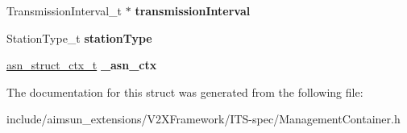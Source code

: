 \begin{DoxyCompactItemize}
\item 
Transmission\+Interval\+\_\+t $\ast$ {\bfseries transmission\+Interval}\hypertarget{structManagementContainer_a5846d098ca88b9ca8c61f3855e55c661}{}\label{structManagementContainer_a5846d098ca88b9ca8c61f3855e55c661}

\item 
Station\+Type\+\_\+t {\bfseries station\+Type}\hypertarget{structManagementContainer_aae54c17babf0ce27ffa2f78524a60a40}{}\label{structManagementContainer_aae54c17babf0ce27ffa2f78524a60a40}

\item 
\hyperlink{structasn__struct__ctx__s}{asn\+\_\+struct\+\_\+ctx\+\_\+t} {\bfseries \+\_\+asn\+\_\+ctx}\hypertarget{structManagementContainer_a44a4156707e45589fb65e7f32a58389b}{}\label{structManagementContainer_a44a4156707e45589fb65e7f32a58389b}

\end{DoxyCompactItemize}


The documentation for this struct was generated from the following file\+:\begin{DoxyCompactItemize}
\item 
include/aimsun\+\_\+extensions/\+V2\+X\+Framework/\+I\+T\+S-\/spec/Management\+Container.\+h\end{DoxyCompactItemize}
